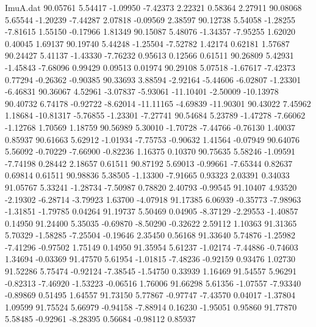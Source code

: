 \begin{filecontents}{ImuA.dat}
  90.05761    5.54417   -1.09950   -7.42373    2.22321    0.58364    2.27911
  90.08068    5.65544   -1.20239   -7.44287    2.07818   -0.09569    2.38597
  90.12738    5.54058   -1.28255   -7.81615    1.55150   -0.17966    1.81349
  90.15087    5.48076   -1.34357   -7.95255    1.62020    0.40045    1.69137
  90.19740    5.44248   -1.25504   -7.52782    1.42174    0.62181    1.57687
  90.24427    5.41137   -1.43330   -7.76232    0.95613    0.12566    0.61511
  90.26809    5.42931   -1.45843   -7.68096    0.99429    0.09513    0.01974
  90.29108    5.07518   -1.67617   -7.42373    0.77294   -0.26362   -0.90385
  90.33693    3.88594   -2.92164   -5.44606   -6.02807   -1.23301   -6.46831
  90.36067    4.52961   -3.07837   -5.93061  -11.10401   -2.50009  -10.13978
  90.40732    6.74178   -0.92722   -8.62014  -11.11165   -4.69839  -11.90301
  90.43022    7.45962    1.18684  -10.81317   -5.76855   -1.23301   -7.27741
  90.54684    5.23789   -1.47278   -7.66062   -1.12768    1.70569    1.18759
  90.56989    5.30010   -1.70728   -7.44766   -0.76130    1.40037    0.85937
  90.61663    5.62912   -1.01934   -7.75753   -0.90632    1.41564   -0.07949
  90.64076    5.56092   -0.70229   -7.66900   -0.82236    1.16375    0.10370
  90.75635    5.58246   -1.09591   -7.74198    0.28442    2.18657    0.61511
  90.87192    5.69013   -0.99661   -7.65344    0.82637    0.69814    0.61511
  90.98836    5.38505   -1.13300   -7.91665    0.93323    2.03391    0.34033
  91.05767    5.33241   -1.28734   -7.50987    0.78820    2.40793   -0.99545
  91.10407    4.93520   -2.19302   -6.28714   -3.79923    1.63700   -4.07918
  91.17385    6.06939   -0.35773   -7.98963   -1.31851   -1.79785    0.04264
  91.19737    5.50469    0.04905   -8.37129   -2.29553   -1.40857    0.14950
  91.24400    5.35035   -0.69870   -8.50290   -0.32622    2.59112    1.10363
  91.31365    5.70329   -1.58285   -7.25504   -0.19646    2.35450    0.56168
  91.33640    5.74876   -1.25982   -7.41296   -0.97502    1.75149    0.14950
  91.35954    5.61237   -1.02174   -7.44886   -0.74603    1.34694   -0.03369
  91.47570    5.61954   -1.01815   -7.48236   -0.92159    0.93476    1.02730
  91.52286    5.75474   -0.92124   -7.38545   -1.54750    0.33939    1.16469
  91.54557    5.96291   -0.82313   -7.46920   -1.53223   -0.06516    1.76006
  91.66298    5.61356   -1.07557   -7.93340   -0.89869    0.51495    1.64557
  91.73150    5.77867   -0.97747   -7.43570    0.04017   -1.37804    1.09599
  91.75524    5.66979   -0.94158   -7.88914    0.16230   -1.95051    0.95860
  91.77870    5.58485   -0.92961   -8.28395    0.56684   -0.98112    0.85937

\end{filecontents}
